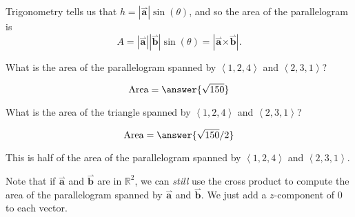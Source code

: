 \documentclass{ximera}
\begin{document}
\begin{theorem}
\begin{explanation}
\begin{image}[2in]
    \end{image}
    Trigonometry tells us that $h = |\overset{\boldsymbol{\rightharpoonup}}{\mathbf{a}}| \sin(\theta)$, and so the
    area of the parallelogram is
    \[
    A = |\overset{\boldsymbol{\rightharpoonup}}{\mathbf{a}}||\overset{\boldsymbol{\rightharpoonup}}{\mathbf{b}}|\sin(\theta) = |\overset{\boldsymbol{\rightharpoonup}}{\mathbf{a}} \boldsymbol\times \overset{\boldsymbol{\rightharpoonup}}{\mathbf{b}}|.
    \]
  \end{explanation}
\end{theorem}



\begin{question}
  What is the area of the parallelogram spanned by $\left< 1,2,4 \right>$ and $\left< 2,3,1 \right>$?
  \begin{prompt}
  \[
  \text{Area} = \answer{\sqrt{150}}
  \]
  \end{prompt}
  \begin{question}
    What is the area of the triangle spanned by $\left< 1,2,4 \right>$ and $\left< 2,3,1 \right>$?
    \begin{prompt}
    \[
    \text{Area} = \answer{\sqrt{150}/2}
    \]
    \end{prompt}
    \begin{hint}
      This is half of the area of the parallelogram spanned by $\left< 1,2,4 \right>$ and $\left< 2,3,1 \right>$.
    \end{hint}
  \end{question}
\end{question}

Note that if $\overset{\boldsymbol{\rightharpoonup}}{\mathbf{a}}$ and $\overset{\boldsymbol{\rightharpoonup}}{\mathbf{b}}$ are in $\mathbb{R}^2$, we can \textit{still}
use the cross product to compute the area of the parallelogram spanned
by $\overset{\boldsymbol{\rightharpoonup}}{\mathbf{a}}$ and $\overset{\boldsymbol{\rightharpoonup}}{\mathbf{b}}$. We just add a $z$-component of $0$ to each
vector.
\end{document}
